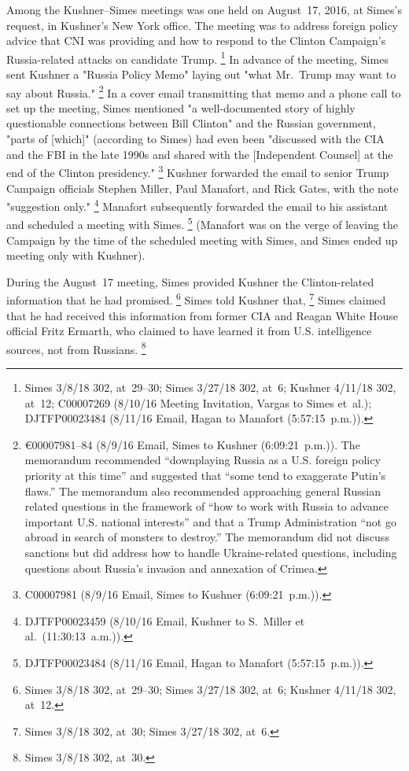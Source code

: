 Among the Kushner--Simes meetings was one held on August~17, 2016, at Simes's request, in Kushner's New York office.
The meeting was to address foreign policy advice that CNI was providing and how to respond to the Clinton Campaign's Russia-related attacks on candidate Trump.%
\footnote{Simes 3/8/18 302, at~29--30;
Simes 3/27/18 302, at~6;
Kushner 4/11/18 302, at~12;
C00007269 (8/10/16 Meeting Invitation, Vargas to Simes et~al.);
DJTFP00023484 (8/11/16 Email, Hagan to Manafort (5:57:15~p.m.)).}
In advance of the meeting, Simes sent Kushner a "Russia Policy Memo" laying out "what Mr.~Trump may want to say about Russia."%
\footnote{€00007981--84 (8/9/16 Email, Simes to Kushner (6:09:21~p.m.)).
The memorandum recommended ``downplaying Russia as a U.S. foreign policy priority at this time'' and suggested that ``some tend to exaggerate Putin's flaws.''
The memorandum also recommended approaching general Russian related questions in the framework of ``how to work with Russia to advance important U.S. national interests'' and that a Trump Administration ``not go abroad in search of monsters to destroy.''
The memorandum did not discuss sanctions but did address how to handle Ukraine-related questions, including questions about Russia's invasion and annexation of Crimea.}
In a cover email transmitting that memo and a phone call to set up the meeting, Simes mentioned "a well-documented story of highly questionable connections between Bill Clinton" and the Russian government, "parts of [which]" (according to Simes) had even been "discussed with the CIA and the FBI in the late 1990s and shared with the [Independent Counsel] at the end of the Clinton presidency."%
\footnote{C00007981 (8/9/16 Email, Simes to Kushner (6:09:21~p.m.)).}
Kushner forwarded the email to senior Trump Campaign officials Stephen Miller, Paul Manafort, and Rick Gates, with the note "suggestion only."%
\footnote{DJTFP00023459 (8/10/16 Email, Kushner to S.~Miller et al.\ (11:30:13~a.m.)).}
Manafort subsequently forwarded the email to his assistant and scheduled a meeting with Simes.%
\footnote{DJTFP00023484 (8/11/16 Email, Hagan to Manafort (5:57:15~p.m.)).}
(Manafort was on the verge of leaving the Campaign by the time of the scheduled meeting with Simes, and Simes ended up meeting only with Kushner).

During the August~17 meeting, Simes provided Kushner the Clinton-related information that he had promised.%
\footnote{Simes 3/8/18 302, at~29--30;
Simes 3/27/18 302, at~6;
Kushner 4/11/18 302, at~12.}
Simes told Kushner that,
\footnote{Simes 3/8/18 302, at~30;
Simes 3/27/18 302, at~6.}
Simes claimed that he had received this information from former CIA and Reagan White House official Fritz Ermarth, who claimed to have learned it from U.S. intelligence sources, not from Russians.%
\footnote{Simes 3/8/18 302, at~30.}


